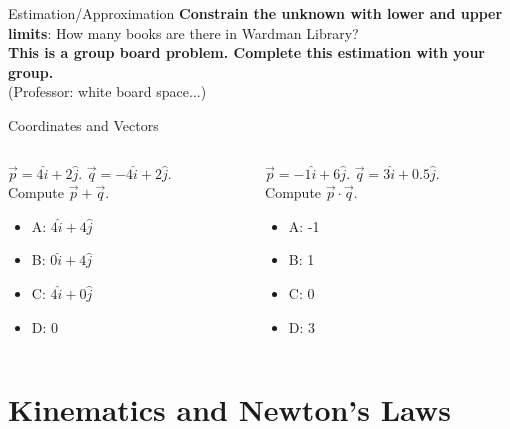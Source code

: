 \documentclass{beamer}
\begin{document}
\begin{frame}{Estimation/Approximation}
\textbf{Constrain the unknown with lower and upper limits}: How many books are there in Wardman Library? \\ \vspace{0.5cm}
\textbf{This is a group board problem.  Complete this estimation with your group.} \\ \vspace{0.5cm}
(Professor: white board space...)
\end{frame}

\begin{frame}{Coordinates and Vectors}
\small
\begin{columns}[T]
\begin{column}{0.5\textwidth}
$\vec{p} = 4\hat{i}+2\hat{j}$.  $\vec{q} = -4\hat{i}+2\hat{j}$.  \\
Compute $\vec{p} + \vec{q}$.
\vspace{0.2cm}
\begin{itemize}
\item A: $4\hat{i}+4\hat{j}$
\item B: $0\hat{i}+4\hat{j}$
\item C: $4\hat{i}+0\hat{j}$
\item D: 0
\end{itemize}
\end{column}
\begin{column}{0.5\textwidth}
$\vec{p} = -1\hat{i}+6\hat{j}$.  $\vec{q} = 3\hat{i}+0.5\hat{j}$.  \\
Compute $\vec{p} \cdot \vec{q}$.
\vspace{0.2cm}
\begin{itemize}
\item A: -1
\item B: 1
\item C: 0
\item D: 3
\end{itemize}
\end{column}
\end{columns}
\end{frame}

\section{Kinematics and Newton's Laws}
\end{document}
